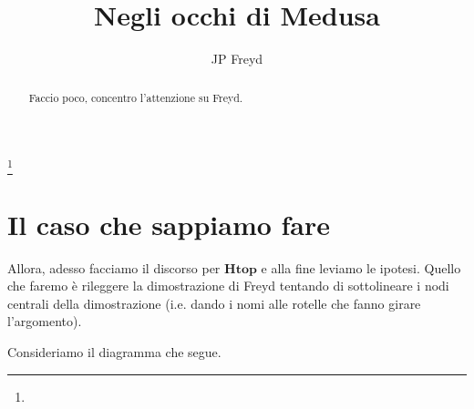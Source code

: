 \documentclass[12pt]{amsart}
\date{}
\def\cate#1{\mathbf{#1}}
\begin{document}
\title{Negli occhi di Medusa}
\author[]
{JP Freyd}
\thanks{} 
\address{}
 
\begin{abstract}
Faccio poco, concentro l'attenzione su Freyd.
\end{abstract} 
\keywords{}
\subjclass{}

\maketitle

\section{Il caso che sappiamo fare}

Allora, adesso facciamo il discorso per $\cate{Htop}$ e alla fine leviamo le ipotesi. Quello che faremo è rileggere la dimostrazione di Freyd tentando di sottolineare i nodi centrali della dimostrazione (i.e. dando i nomi alle rotelle che fanno girare l'argomento).

Consideriamo il diagramma che segue.
\begin{center}
\end{center}
\end{document}
